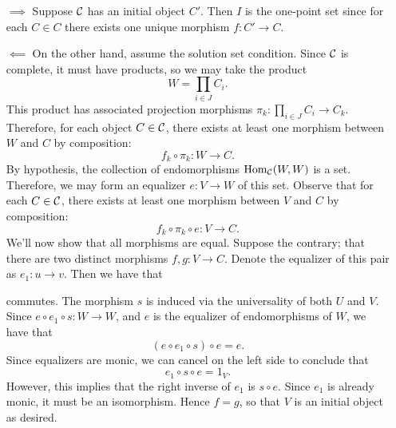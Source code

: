     \begin{prf}
        \begin{itemize}
            \item[$\implies$] 
             Suppose $\mathcal{C}$ has an initial object $C'$. Then $I$ is the one-point 
             set since for each $C \in C$ there exists one unique morphism 
             $f: C' \to C$. 

            \item[$\impliedby$] 
            On the other hand, assume the solution set condition. 
            Since $\mathcal{C}$ is complete, it must have products, so we may 
            take the product
            \[
                W = \prod_{i \in J}C_i.
            \]
            This product has associated projection morphisms 
            $\displaystyle \pi_k: \prod_{i \in J}C_i \to C_k$. Therefore, 
            for each object $C \in \mathcal{C}$, there exists at least one 
            morphism between $W$ and $C$ by composition:
            \[
                f_k \circ \pi_k: W \to C.
            \]
            By hypothesis, the collection of endomorphisms $\operatorname{\mathrm{Hom}}_{\mathcal{C}}(W, W)$ 
            is a set. Therefore, we may form an equalizer $e: V \to W$ 
            of this set. Observe that for each $C \in \mathcal{C}$, there exists 
            at least one morphism between $V$ and $C$ by composition:
            \[
                f_k \circ \pi_k\circ e: V \to C.
            \]
            We'll now show that all morphisms are equal. Suppose the contrary; 
            that there are two distinct morphisms $f, g: V \to C$. Denote the equalizer 
            of this pair as $e_1: u \to v$. Then we have that 
            \begin{center}
            \end{center}
            commutes. The morphism $s$ is induced via the universality of 
            both $U$ and $V$. Since $e \circ e_1 \circ s : W \to W$, and 
            $e$ is the equalizer of endomorphisms of $W$, we have that 
            \[
                (e \circ e_1 \circ s)\circ e = e.  
            \]
            Since equalizers are monic, we can cancel on the left side to conclude 
            that 
            \[
                e_1 \circ s \circ e = 1_V. 
            \]
            However, this implies that the right inverse of $e_1$ is $s \circ e$. 
            Since $e_1$ is already monic, it must be an isomorphism. Hence $f = g$, so that 
            $V$ is an initial object as desired. 
        \end{itemize}
    \end{prf}

